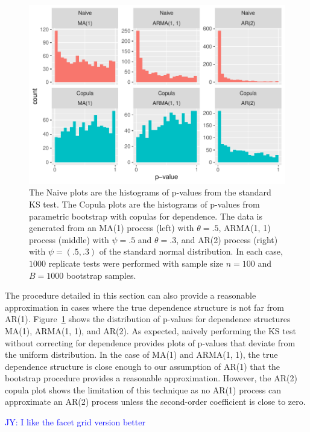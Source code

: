 \documentclass[12pt, letterpaper, titlepage]{article}
\newcommand{\jy}[1]{\textcolor{blue}{JY: #1}}
\begin{document}
\begin{figure}[tbp]
  \centering
  \includegraphics[width=\textwidth]{hist_ma1_arma_ar2_D}
  \caption{The Naive plots are the histograms of p-values from the standard KS 
  test. The Copula plots are the histograms of p-values from parametric 
  bootstrap with copulas for dependence. The data is generated from an MA(1) 
  process (left) with $\theta = .5$, ARMA(1, 1) process (middle) with $\psi = 
  .5$ and $\theta = .3$, and AR(2) process (right) with $\psi = (.5, .3)$ of the 
  standard normal distribution. In each case, $1000$ replicate tests were 
  performed with sample size $n = 100$ and $B = 1000$ bootstrap samples.}
  \label{fig:hist_ma1_arma_ar2_D}
\end{figure}

The procedure detailed in this section can also provide a reasonable 
approximation in cases where the true dependence structure is not far from 
AR(1). Figure~\ref{fig:hist_ma1_arma_ar2_D} shows the distribution of p-values 
for dependence structures MA(1), ARMA(1, 1), and AR(2). As expected, 
naively performing the KS test without correcting for dependence provides plots 
of p-values that deviate from the uniform distribution. In the case of MA(1) 
and ARMA(1, 1), the true dependence structure is close enough to our 
assumption of AR(1) that the bootstrap procedure provides a reasonable 
approximation. However, the AR(2) copula plot shows the limitation of this 
technique as no AR(1) process can approximate an AR(2) process unless the
second-order coefficient is close to zero.

\jy{I like the facet grid version better}
\end{document}

